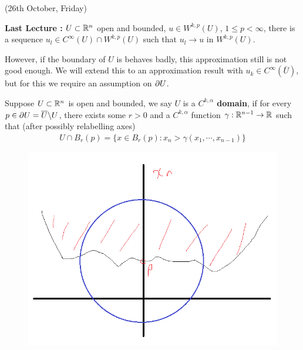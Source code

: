 \documentclass[10pt,a4paper]{report}
\begin{document}
\newday

(26th October, Friday)
\s

\textbf{Last Lecture :} $U\subset \mathbb{R}^n$ open and bounded, $u\in W^{k,p} (U) $, $1\leq  p<\infty$, there is a sequence $u_l \in C^{\infty}(U) \cap W^{k,p}(U)$ such that $u_l \rightarrow u$ in $W^{k,p}(U)$.
\s

However, if the boundary of $U$ is behaves badly, this approximation still is not good enough. We will extend this to an approximation result with $u_k \in C^{\infty}(\bar{U})$, but for this we require an assumption on $\partial U$.
\s

 Suppose $U\subset \mathbb{R}^n$ is open and bounded, we say $U$ is a \textbf{$C^{k,\alpha}$ domain}, if for every $p\in \partial U = \overline{U} \backslash U$, there exists some $r>0$ and a $C^{k,\alpha}$ function $\gamma : \mathbb{R}^{n-1} \rightarrow \mathbb{R}$ such that (after possibly relabelling axes)
\begin{align*}
U \cap B_r (p) = \{ x\in B_{r}(p) : x_n > \gamma(x_1, \cdots, x_{n-1}) \}
\end{align*}
\begin{figure}[h]
	\centering
	\includegraphics[scale=0.5]{2}
\end{figure}
\end{document}
